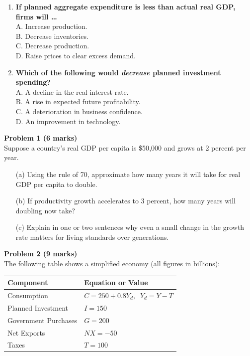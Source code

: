 \documentclass[12pt]{article}
\begin{document}
\begin{enumerate}
    \item \textbf{If planned aggregate expenditure is less than actual real GDP, firms will …}\\
    A. Increase production.\\
    B. Decrease inventories.\\
    C. Decrease production.\\
    D. Raise prices to clear excess demand.\\[4pt]
\newpage
    \item \textbf{Which of the following would \emph{decrease} planned investment spending?}\\
    A. A decline in the real interest rate.\\
    B. A rise in expected future profitability.\\
    C. A deterioration in business confidence.\\
    D. An improvement in technology.\\[4pt]
\end{enumerate}


\noindent\textbf{Problem 1 (6 marks)}\\
Suppose a country’s real GDP per capita is \$50{,}000 and grows at 2 percent per year.

\begin{enumerate}
    \item[(a)] Using the rule of 70, approximate how many years it will take for real GDP per capita to double.\\
    \item[(b)] If productivity growth accelerates to 3 percent, how many years will doubling now take?\\
    \item[(c)] Explain in one or two sentences why even a small change in the growth rate matters for living standards over generations.
\end{enumerate}

\vspace{12pt}

\noindent\textbf{Problem 2 (9 marks)}\\
The following table shows a simplified economy (all figures in billions):

\begin{center}
\begin{tabular}{l l}
\toprule
\textbf{Component} & \textbf{Equation or Value} \\
\midrule
Consumption & $C = 250 + 0.8Y_d,\;\; Y_d = Y - T$\\
Planned Investment & $I = 150$\\
Government Purchases & $G = 200$\\
Net Exports & $NX = -50$\\
Taxes & $T = 100$\\
\bottomrule
\end{tabular}
\end{center}
\end{document}
